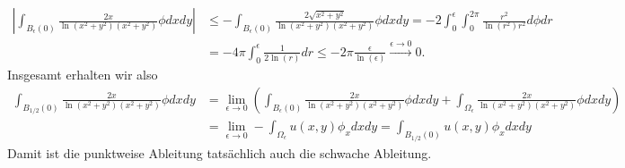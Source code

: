 \begin{solution}
\begin{align*}
  \left|\int_{B_\epsilon(0)}\frac{2x}{\ln(x^2+y^2)(x^2+y^2)}\phi dxdy\right|
  &\leq -\int_{B_\epsilon(0)}\frac{2\sqrt{x^2 +y^2}}{\ln(x^2+y^2)(x^2+y^2)}\phi dxdy
  = -2\int_0^\epsilon\int_0^{2\pi}\frac{r^2}{\ln(r^2)r^2} d\phi dr \\
  &= -4\pi\int_0^\epsilon \frac{1}{2\ln(r)} dr \leq -2\pi \frac{\epsilon}{\ln(\epsilon)}
  \xrightarrow{\epsilon \to 0} 0.
\end{align*}
Insgesamt erhalten wir also
\begin{align*}
\int_{B_{1/2}(0)}\frac{2x}{\ln(x^2+y^2)(x^2+y^2)}\phi dxdy &=
\lim_{\epsilon \to 0}\left(\int_{B_\epsilon(0)}\frac{2x}{\ln(x^2+y^2)(x^2+y^2)}\phi dxdy
+ \int_{\Omega_\epsilon}\frac{2x}{\ln(x^2+y^2)(x^2+y^2)}\phi dxdy\right) \\
&= \lim_{\epsilon \to 0}- \int_{\Omega_\epsilon}u(x,y)\phi_x dxdy
= \int_{B_{1/2}(0)}u(x,y)\phi_x dxdy
\end{align*}
Damit ist die punktweise Ableitung tatsächlich auch die schwache Ableitung.
\end{solution}

